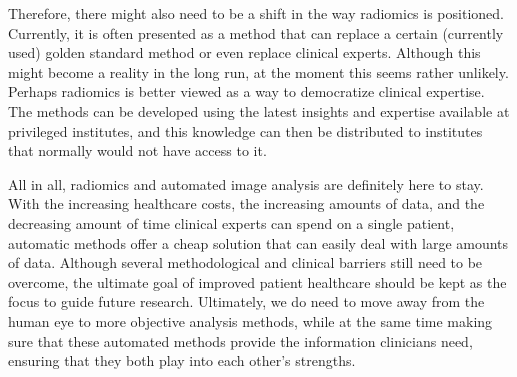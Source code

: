 Therefore, there might also need to be a shift in the way radiomics is positioned.
Currently, it is often presented as a method that can replace a certain (currently used) golden standard method or even replace clinical experts.
Although this might become a reality in the long run, at the moment this seems rather unlikely.
Perhaps radiomics is better viewed as a way to democratize clinical expertise.
The methods can be developed using the latest insights and expertise available at privileged institutes, and this knowledge can then be distributed to institutes that normally would not have access to it.

All in all, radiomics and automated image analysis are definitely here to stay.
With the increasing healthcare costs, the increasing amounts of data, and the decreasing amount of time clinical experts can spend on a single patient, automatic methods offer a cheap solution that can easily deal with large amounts of data.
Although several methodological and clinical barriers still need to be overcome, the ultimate goal of improved patient healthcare should be kept as the focus to guide future research.
Ultimately, we do need to move away from the human eye to more objective analysis methods, while at the same time making sure that these automated methods provide the information clinicians need, ensuring that they both play into each other's strengths.
